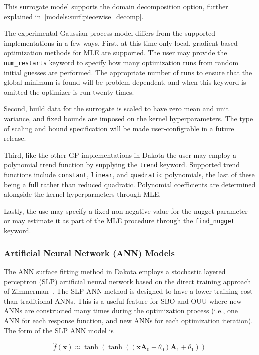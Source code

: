 This surrogate model supports the domain decomposition option, further explained in~\ref{models:surf:piecewise_decomp}.

The experimental Gaussian process model differs from the supported implementations in
a few ways. First, at this time only local, gradient-based optimization methods 
for MLE are supported. The user may provide the \texttt{num\_restarts} keyword to
specify how many optimization runs from random initial guesses are performed. The 
appropriate number of runs to ensure that the global minimum is found will be 
problem dependent, and when this keyword is omitted the optimizer is run twenty times.

Second, build data for the surrogate is scaled to have zero mean and unit variance,
and fixed bounds are imposed on the kernel hyperparameters. The type of scaling
and bound specification will be made user-configrable in a future release.

Third, like the other GP implementations in Dakota the user may employ a polynomial
trend function by supplying the \texttt{trend} keyword. Supported trend functions
include \texttt{constant}, \texttt{linear}, and \texttt{quadratic} polynomials, the last of
these being a full rather than reduced quadratic. Polynomial coefficients 
are determined alongside the kernel hyperparmeters through MLE.

Lastly, the use may specify a fixed non-negative value for the nugget parameter or may
estimate it as part of the MLE procedure through the \texttt{find\_nugget} keyword.


\subsubsection{Artificial Neural Network (ANN) Models}\label{models:surf:ann}

The ANN surface fitting method in Dakota employs a stochastic layered
perceptron (SLP) artificial neural network based on the direct
training approach of Zimmerman~\cite{Zim96}. The SLP ANN method is
designed to have a lower training cost than traditional ANNs. This is
a useful feature for SBO and OUU where new ANNs are constructed many
times during the optimization process (i.e., one ANN for each response
function, and new ANNs for each optimization iteration). The form of
the SLP ANN model is

\begin{equation}
  \hat{f}(\mathbf{x}) \approx
  \tanh(\tanh((\mathbf{x A}_{0}+\theta_{0})\mathbf{A}_{1}+\theta_{1}))
  \label{models:surf:equation09}
\end{equation}

